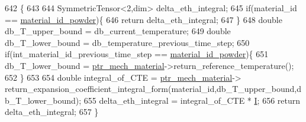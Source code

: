 \begin{DoxyCode}
642                                                                                  \{
643 
644         SymmetricTensor<2,dim> delta\_eth\_integral;
645         \textcolor{keywordflow}{if}(material\_id == \hyperlink{classConstitutive__Laws_1_1Thermo__Elasto__Plastic_a4f2bdb1404b0706803da3407ce991667}{material\_id\_powder})\{
646             \textcolor{keywordflow}{return} delta\_eth\_integral;
647         \}
648         \textcolor{keywordtype}{double} db\_T\_upper\_bound = db\_current\_temperature;
649         \textcolor{keywordtype}{double} db\_T\_lower\_bound = db\_temperature\_previous\_time\_step;
650         \textcolor{keywordflow}{if}(int\_material\_id\_previous\_time\_step == \hyperlink{classConstitutive__Laws_1_1Thermo__Elasto__Plastic_a4f2bdb1404b0706803da3407ce991667}{material\_id\_powder})\{
651             db\_T\_lower\_bound = \hyperlink{classConstitutive__Laws_1_1Thermo__Elasto__Plastic_a5a59fd71829d58859a122fe74628a9e4}{ptr\_mech\_material}->return\_reference\_temperature();
652         \}
653 
654         \textcolor{keywordtype}{double} integral\_of\_CTE = \hyperlink{classConstitutive__Laws_1_1Thermo__Elasto__Plastic_a5a59fd71829d58859a122fe74628a9e4}{ptr\_mech\_material}->
      return\_expansion\_coefficient\_integral\_form(material\_id,db\_T\_upper\_bound,db\_T\_lower\_bound);
655         delta\_eth\_integral  = integral\_of\_CTE * \hyperlink{classConstitutive__Laws_1_1Thermo__Elasto__Plastic_a82407b5024a6bdd7dc424dfa3562acf6}{I};
656         \textcolor{keywordflow}{return} delta\_eth\_integral;
657     \}
\end{DoxyCode}
